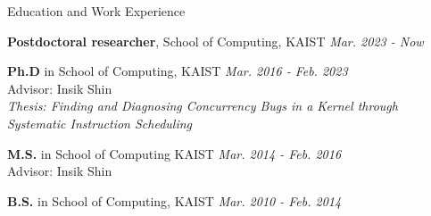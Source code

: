 
\begin{rSection}{Education and Work Experience}

\textbf{Postdoctoral researcher}, School of Computing, KAIST \hfill {\em Mar. 2023 - Now}

\textbf{Ph.D} in School of Computing, KAIST \hfill {\em Mar. 2016 - Feb. 2023} \\
\setlength{\leftskip}{8pt} Advisor: Insik Shin \\
\textit{Thesis: Finding and Diagnosing Concurrency Bugs in a Kernel through Systematic Instruction Scheduling}

\setlength{\leftskip}{0pt}
\textbf{M.S.} in School of Computing KAIST \hfill {\em Mar. 2014 - Feb. 2016} \\
\setlength{\leftskip}{8pt} Advisor: Insik Shin

\setlength{\leftskip}{0pt}
\textbf{B.S.} in School of Computing, KAIST \hfill {\em Mar. 2010 - Feb. 2014}

\end{rSection}
